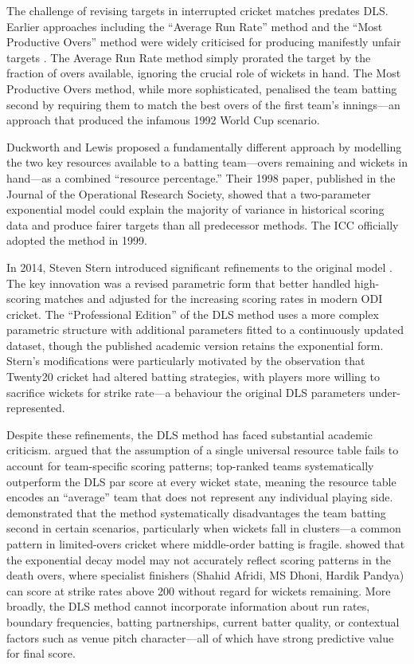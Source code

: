 \documentclass[10pt,a4paper,twocolumn]{article}
\begin{document}
The challenge of revising targets in interrupted cricket matches predates DLS. Earlier approaches including the ``Average Run Rate'' method and the ``Most Productive Overs'' method were widely criticised for producing manifestly unfair targets \citep{duckworth1998}. The Average Run Rate method simply prorated the target by the fraction of overs available, ignoring the crucial role of wickets in hand. The Most Productive Overs method, while more sophisticated, penalised the team batting second by requiring them to match the best overs of the first team's innings---an approach that produced the infamous 1992 World Cup scenario.

Duckworth and Lewis \citep{duckworth1998} proposed a fundamentally different approach by modelling the two key resources available to a batting team---overs remaining and wickets in hand---as a combined ``resource percentage.'' Their 1998 paper, published in the Journal of the Operational Research Society, showed that a two-parameter exponential model could explain the majority of variance in historical scoring data and produce fairer targets than all predecessor methods. The ICC officially adopted the method in 1999.

In 2014, Steven Stern introduced significant refinements to the original model \citep{stern2016}. The key innovation was a revised parametric form that better handled high-scoring matches and adjusted for the increasing scoring rates in modern ODI cricket. The ``Professional Edition'' of the DLS method uses a more complex parametric structure with additional parameters fitted to a continuously updated dataset, though the published academic version retains the exponential form. Stern's modifications were particularly motivated by the observation that Twenty20 cricket had altered batting strategies, with players more willing to sacrifice wickets for strike rate---a behaviour the original DLS parameters under-represented.

Despite these refinements, the DLS method has faced substantial academic criticism. \citet{mchale2011modelling} argued that the assumption of a single universal resource table fails to account for team-specific scoring patterns; top-ranked teams systematically outperform the DLS par score at every wicket state, meaning the resource table encodes an ``average'' team that does not represent any individual playing side. \citet{bhattacharya2011revised} demonstrated that the method systematically disadvantages the team batting second in certain scenarios, particularly when wickets fall in clusters---a common pattern in limited-overs cricket where middle-order batting is fragile. \citet{carter2005model} showed that the exponential decay model may not accurately reflect scoring patterns in the death overs, where specialist finishers (Shahid Afridi, MS Dhoni, Hardik Pandya) can score at strike rates above 200 without regard for wickets remaining. More broadly, the DLS method cannot incorporate information about run rates, boundary frequencies, batting partnerships, current batter quality, or contextual factors such as venue pitch character---all of which have strong predictive value for final score.
\end{document}
